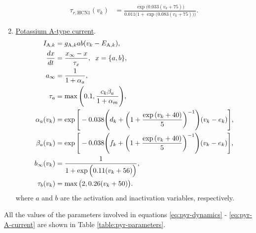 \documentclass[../main.tex]{subfiles}
\begin{document}
\begin{enumerate}
\begin{equation}
\begin{aligned}
            \tau_{r,\text{HCN1}}(v_k) &= \displaystyle\frac{\exp{\big(0.033(v_k+75)\big)}}{0.011\Big(1+\exp{\big(0.083(v_k+75) \big)}\Big)}.
            \label{eq:pyr-hyperpolarization-current}
        \end{aligned}
        \end{equation}
        \clearpage
    \item \underline{Potassium A-type current}. 
        \begin{equation}
        \begin{aligned}
            I_{\text{A},k} &= g_{\text{A},k} ab(v_k-E_{\text{A},k}), \\
            \displaystyle\frac{dx}{dt} &= \displaystyle\frac{x_\infty-x}{\tau_x}, \hspace{0.2cm} x = \{a,b\}, \\
            a_\infty &= \displaystyle\frac{1}{1+\alpha_a},\\ %
            \tau_a &= \max\Bigg(0.1, \displaystyle\frac{c_k\beta_a}{1+\alpha_m} \Bigg), \\
            \alpha_a(v_k) &= \exp{\Bigg[ -0.038\Bigg(d_k + \bigg(1+\displaystyle\frac{\exp{(v_k+40)}}{5}\bigg)^{-1}\Bigg)(v_k-e_k)\Bigg]}, \\
            \beta_a(v_k) &= \exp{\Bigg[ -0.038\Bigg(f_k + \bigg(1+\displaystyle\frac{\exp{(v_k+40)}}{5}\bigg)^{-1}\Bigg)(v_k-e_k)\Bigg]}, \\
            b_\infty(v_k) &= \displaystyle\frac{1}{1+\exp{\Big(0.11(v_k+56)\Big)}}, \\
            \tau_b(v_k) &= \max\big(2,0.26(v_k+50)\big).
            \label{eq:pyr-A-current}
        \end{aligned}
        \end{equation}
        where $a$ and $b$ are the activation and inactivation variables, respectively.
\end{enumerate}
All the values of the parameters involved in equations \eqref{eq:pyr-dynamics} - \eqref{eq:pyr-A-current} are shown in Table \ref{table:pyr-parameters}.
\end{document}
